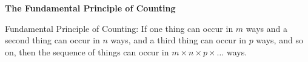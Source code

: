 \begin{center}
\textbf{The Fundamental Principle of Counting 
}
\end{center}

\vspce 


Fundamental Principle of Counting: If one thing can occur in $m$ ways and a second thing can occur in $n$ ways, and a third thing can occur in $p$ ways, and so on, then the sequence of things can occur in $m \times n \times p \times \ldots$ ways.

\vspce

